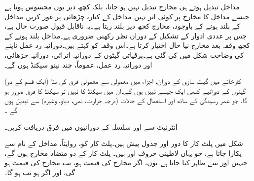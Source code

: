 مداخل تبدیل ہوتے ہی مخارج تبدیل نہیں ہو جاتا، بلکہ کچھ دیر یوں محسوس ہوتا ہے جیسے مداخل کا مخارج پر کوئی اثر نہیں۔مداخل کے کنارہ چڑھائی پر غور کریں۔مداخل کے بلند ہونے کے باوجود، مخارج کچھ دیر بلند رہتا ہے۔یہ ناقابل قبول صورت حال ہے، جس پر عددی ادوار کے تشکیل کے دوران نظر رکھنی ضروری ہے۔مداخل بلند ہونے کے کچھ وقفہ بعد مخارج نیا حال اختیار کرتا ہے۔اس وقفہ کو  کہتے ہیں۔دورانیہ رد عمل ناپنے کی وضاحت شکل میں کی گئی ہے۔برقیاتی گیٹوں کے دورانیہ اترائی، دورانیہ چڑھائی، اور دورانیہ رد عمل، عموماً، چند نینو سیکنڈ ہوں گے۔

کارخانے میں گیٹ سازی کے دوران، اجزاء میں معمولی سے معمولی فرق کی بنا (ایک قسم کے دو) گیٹوں کے دورانیے کبھی ایک جیسے نہیں ہوں گے۔ان میں  سیکنڈ کا نہیں تو سیکنڈ کا فرق ضرور ہو گا، جو عمر رسیدگی کے ساتھ اور استعمال کے حالات (درجہ حرارت، نمی، دباو، وغیرہ) سے تبدیل ہوں گے ۔

انٹرنیٹ سے  اور  سلسلہ کے دورانیوں میں فرق دریافت کریں۔

شکل  میں  پلٹ کار کا دور اور جدول پیش ہیں۔پلٹ کار کو، روایتاً، مداخل کے نام سے پکارا جاتا ہے، جو یہاں لاطینی حروف   اور  ہیں۔ پلٹ کار کے دو متضاد مخارج ہوں گے، جنہیں  اور  سے ظاہر کیا جاتا ہے۔یوں، اگر مخارج  کی قیمت  ہو، تب مخارج  کی قیمت  ہو گی، اور اگر  ہو تب  ہو گا۔



